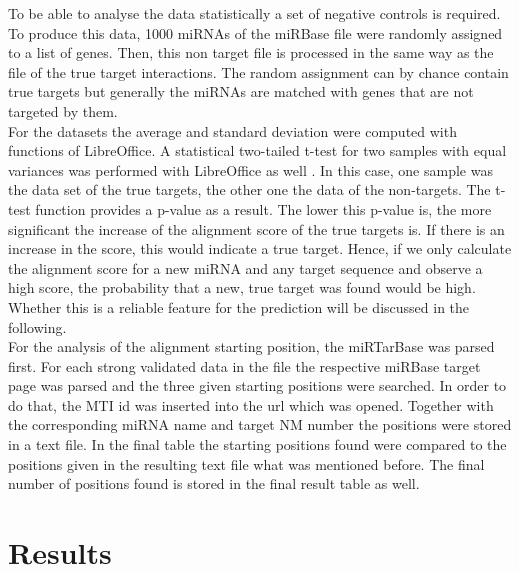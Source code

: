 \documentclass[11pt,  a4paper]{report}
\begin{document}
To be able to analyse the data statistically a set of negative controls is required. To produce this data, 1000 miRNAs of the miRBase file were randomly assigned to a list of genes. Then, this non target file is processed in the same way as the file of the true target interactions. The random assignment can by chance contain true targets but generally the miRNAs are matched with genes that are not targeted by them. \\

For the datasets the average and standard deviation were computed with functions of LibreOffice. A statistical two-tailed t-test for two samples with equal variances was performed with LibreOffice as well \cite{ttest}. In this case, one sample was the data set of the true targets, the other one the data of the non-targets. The t-test function provides a p-value as a result. The lower this p-value is, the more significant the increase of the alignment score of the true targets is. If there is an increase in the score, this would indicate a true target. Hence, if we only calculate the alignment score for a new miRNA and any target sequence and observe a high score, the probability that a new, true target was found would be high. Whether this is a reliable feature for the prediction will be discussed in the following.\\

For the analysis of the alignment starting position, the miRTarBase was parsed first. For each strong validated data in the file the respective miRBase target page was parsed and the three given starting positions were searched. In order to do that, the MTI id was inserted into the url which was opened. Together with the corresponding miRNA name and target NM number the positions were stored in a text file. In the final table the starting positions found were compared to the positions given in the resulting text file what was mentioned before. The final number of positions found is stored in the final result table as well. 



\vspace{1cm}



\chapter{Results}
\label{chapter:results}
\end{document}
